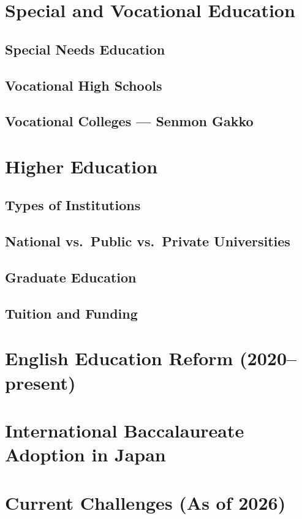 \section{Special and Vocational Education}
\subsection{Special Needs Education}
\subsection{Vocational High Schools}
\subsection{Vocational Colleges --- Senmon Gakko}

\section{Higher Education}
\subsection{Types of Institutions}
\subsection{National vs.\ Public vs.\ Private Universities}
\subsection{Graduate Education}
\subsection{Tuition and Funding}

\section{English Education Reform (2020--present)}
\section{International Baccalaureate Adoption in Japan}
\section{Current Challenges (As of 2026)}


